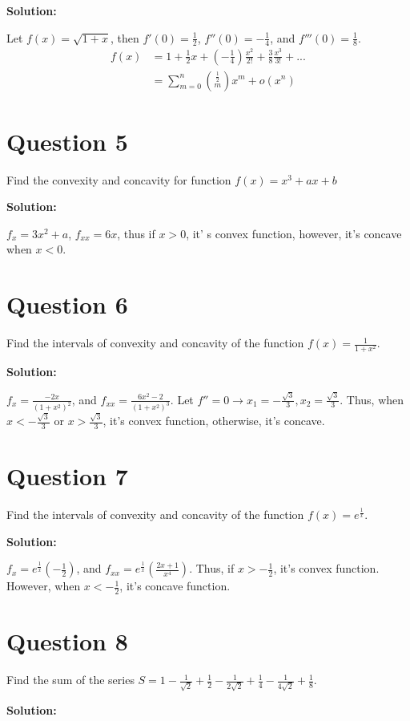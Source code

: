 \documentclass[11pt]{article} %
\begin{document}
\textbf{Solution:}

Let $f(x)=\sqrt{1+x}$, then $f'(0)=\frac{1}{2}$, $f''(0)=-\frac{1}{4}$, and $f'''(0)=\frac{1}{8}$.
\begin{align*}
	f(x)&=1+\frac{1}{2}x+(-\frac{1}{4})\frac{x^2}{2!}+\frac{3}{8}\frac{x^3}{3!}+...\\
	&= \sum_{m=0}^n \binom{\frac{1}{2}}{m}x^m+o(x^n)	
\end{align*}
		
\section{Question 5}
Find the convexity and concavity for function $f(x)=x^3+ax+b$

\textbf{Solution:}

$f_x=3x^2+a$, $f_{xx}=6x$, thus if $x>0$, it' s convex function, however, it's concave when $x<0$.

\section{Question 6}
Find the intervals of  convexity and concavity of the function $f(x)=\frac{1}{1+x^2}$. 

\textbf{Solution:}

$f_x=\frac{-2x}{(1+x^2)^2}$, and $f_{xx}=\frac{6x^2-2}{(1+x^2)^3}$. Let $f''=0\rightarrow x_1=-\frac{\sqrt{3}}{3}, x_2= \frac{\sqrt{3}}{3}$. Thus, 
when $x<-\frac{\sqrt{3}}{3}$ or $x>\frac{\sqrt{3}}{3}$, it's convex function, otherwise, it's concave. 

\section{Question 7}
Find the intervals of convexity and concavity of the function $f(x)=e^{\frac{1}{x}}$.
	
	\textbf{Solution:}
	
	$f_x=e^{\frac{1}{x}}(-\frac{1}{2})$, and $f_{xx}=e^{\frac{1}{x}}(\frac{2x+1}{x^4})$.
	Thus, if  $x>-\frac{1}{2}$, it's convex function. However, when $x<-\frac{1}{2}$, it's concave function. 
	
\section{Question 8}
Find the sum of the series $S=1-\frac{1}{\sqrt{2}}+\frac{1}{2}-\frac{1}{2\sqrt{2}}+\frac{1}{4}-\frac{1}{4\sqrt{2}}+\frac{1}{8}$.

\textbf{Solution:}
\end{document}
